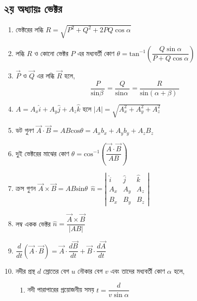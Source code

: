 \documentclass[a4paper,12pt]{article}
\begin{document}
\subsection{২য় অধ্যায়ঃ ভেক্টর}
\begin{enumerate}[ wide=0em, label=\textenglish{\textbf{ \arabic* .}}, itemsep=0pt, parsep=1ex]
    \item ভেক্টরের লব্ধি $R=\sqrt{P^2+Q^2+2PQ \cos\alpha }$

    \item  লব্ধি $R$ ও কোনো ভেক্টর $P$ এর মধ্যবর্তী কোণ $\theta ={{\mathrm{tan}}^{-1} \left(\dfrac{Q \sin \alpha }{P+Q \cos\alpha }\right)\ }$
        
    \item  $\overrightarrow{P}$ ও $\overrightarrow{Q}$ এর লব্ধি $\overrightarrow{R}$ হলে, 
    \[\dfrac{P}{{\mathrm{sin} \beta \ }}=\dfrac{Q}{{\mathrm{sin} \alpha \ }}=\dfrac{R}{{\mathrm{sin} \left(\alpha +\beta \right)\ }}\] 

    \item  $A=A_x\hat{i}+A_y\hat{j}+A_z\hat{k}$ হলে $\left|A\right|=\sqrt{A^2_x+A^2_y+A^2_z}\ $ 

    \item  ডট গুনণ $\overrightarrow{A}\cdot \overrightarrow{B}=AB{\mathrm{cos} \theta }=A_xb_x+A_yb_y+A_zB_z$

    \item  দুই ভেক্টরের মাঝের কোণ $\theta ={{\mathrm{cos}}^{-1} \left(\dfrac{\overrightarrow{A}\cdot \overrightarrow{B}}{AB}\right)\ }$
    
    \item  ক্রস গুণন $\overrightarrow{A}\times \overrightarrow{B}=AB{\mathrm{sin} \theta \ }\ \hat{n}=\left| \begin{array}{ccc}
    \hat{i} & \hat{j} & \hat{k} \\ 
    A_x & A_y & A_z \\ 
    B_x & B_y & B_z \end{array}
    \right|$

    \item  লম্ব একক ভেক্টর $\hat{n}=\dfrac{\overrightarrow{A}\times \overrightarrow{B}}{\left|AB\right|}\ $

    \item  $\dfrac{d}{dt}\left(\overrightarrow{A}\cdot \overrightarrow{B}\right)=\overrightarrow{A}\cdot \dfrac{d\overrightarrow{B}}{dt}+\overrightarrow{B}\cdot \dfrac{d\overrightarrow{A}}{dt}$

    \item  নদীর প্রস্থ $d$ স্রোতের বেগ $u$ নৌকার বেগ $v$ এবং তাদের মধ্যবর্তী কোণ $\alpha $ হলে, 
    \begin{enumerate}
        \item  নদী পারাপারের প্রয়োজনীয় সময় $t=\dfrac{d}{v \sin\alpha }$


\end{enumerate}
\end{enumerate}
\end{document}
